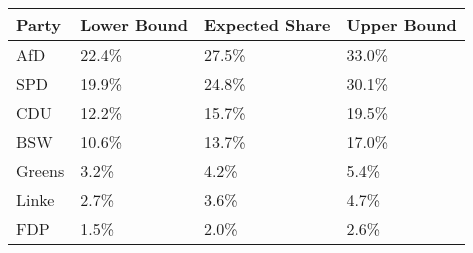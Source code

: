 \begin{tabular}{llll}
  \hline
Party & Lower Bound & Expected Share & Upper Bound \\ 
  \hline
AfD & 22.4\% & 27.5\% & 33.0\% \\ 
  SPD & 19.9\% & 24.8\% & 30.1\% \\ 
  CDU & 12.2\% & 15.7\% & 19.5\% \\ 
  BSW & 10.6\% & 13.7\% & 17.0\% \\ 
  Greens & 3.2\% & 4.2\% & 5.4\% \\ 
  Linke & 2.7\% & 3.6\% & 4.7\% \\ 
  FDP & 1.5\% & 2.0\% & 2.6\% \\ 
   \hline
\end{tabular}
